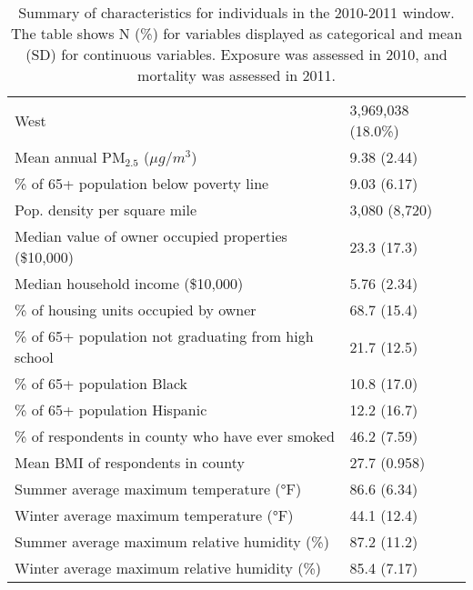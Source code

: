 \begin{table}[ht]
\begin{tabular}{ll}
    \hspace{10pt}West & 3,969,038 (18.0\%) \\ 
  Mean annual PM\(_{2.5}\) (\(\mu g/m^3 \)) & 9.38 (2.44) \\ 
  \% of 65+ population below poverty line & 9.03 (6.17) \\ 
  Pop. density per square mile & 3,080 (8,720) \\ 
  Median value of owner occupied properties (\$10,000) & 23.3 (17.3) \\ 
  Median household income (\$10,000) & 5.76 (2.34) \\ 
  \% of housing units occupied by owner & 68.7 (15.4) \\ 
  \% of 65+ population not graduating from high school & 21.7 (12.5) \\ 
  \% of 65+ population Black & 10.8 (17.0) \\ 
  \% of 65+ population Hispanic & 12.2 (16.7) \\ 
  \% of respondents in county who have ever smoked & 46.2 (7.59) \\ 
  Mean BMI of respondents in county & 27.7 (0.958) \\ 
  Summer average maximum temperature (°F) & 86.6 (6.34) \\ 
  Winter average maximum temperature (°F) & 44.1 (12.4) \\ 
  Summer average maximum relative humidity (\%) & 87.2 (11.2) \\ 
  Winter average maximum relative humidity (\%) & 85.4 (7.17) \\ 
   \hline
\end{tabular}
\caption{Summary of characteristics for individuals in
        the 2010-2011 window. The table shows N (\%) for variables displayed
        as categorical and mean (SD) for continuous variables.
        Exposure was assessed in 2010, and mortality was assessed in 2011.} 
\label{tab:table1}
\end{table}
